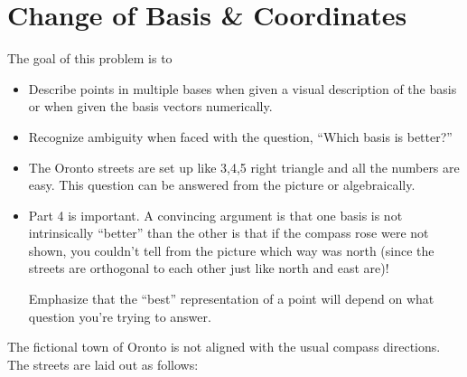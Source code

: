 \documentclass{problemset}
\begin{document}
\section*{Change of Basis \& Coordinates}

	\question
	\begin{annotation}
		\begin{goals}

			The goal of this problem is to
			\begin{itemize}
				\item Describe points in multiple bases when given a visual description of the basis
					or when given the basis vectors numerically.
				\item Recognize ambiguity when faced with the question, ``Which basis is better?''
			\end{itemize}
		\end{goals}

		\begin{notes}
			\begin{itemize}
				\item The Oronto streets are set up like 3,4,5 right triangle and all the numbers are easy.
					This question can be answered from the picture or algebraically.
				\item Part 4 is important. A convincing argument is that one basis is not intrinsically
					``better'' than the other is that if the compass rose were
					not shown, you couldn't tell from the picture which way was north (since the streets are orthogonal
					to each other just like north and east are)!

					Emphasize that the ``best'' representation of a point will depend on what
					question you're trying to answer.
			\end{itemize}
		\end{notes}
	\end{annotation}
	The fictional town of Oronto is not aligned with the usual
	compass directions. The streets are laid out as follows:
\end{document}
